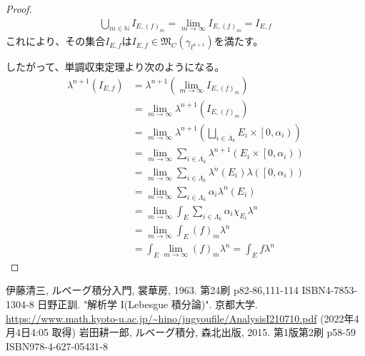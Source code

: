 \documentclass[dvipdfmx]{jsarticle}
\begin{document}
\begin{proof}
\begin{align*}
\bigcup_{m \in \mathbb{N}} I_{E,(f)_{m}} = \lim_{m \rightarrow \infty}I_{E,(f)_{m}} = I_{E,f}
\end{align*}
これにより、その集合$I_{E,f}$は$I_{E,f} \in \mathfrak{M}_{C}\left( \gamma_{l^{n + 1}} \right)$を満たす。\par
したがって、単調収束定理より次のようになる。
\begin{align*}
\lambda^{n + 1}\left( I_{E,f} \right) &= \lambda^{n + 1}\left( \lim_{m \rightarrow \infty}I_{E,(f)_{m}} \right)\\
&= \lim_{m \rightarrow \infty}{\lambda^{n + 1}\left( I_{E,(f)_{m}} \right)}\\
&= \lim_{m \rightarrow \infty}{\lambda^{n + 1}\left( \bigsqcup_{i \in \varLambda_{k}} {E_{i} \times \left[ 0,\alpha_{i} \right)} \right)}\\
&= \lim_{m \rightarrow \infty}{\sum_{i \in \varLambda_{k}} {\lambda^{n + 1}\left( E_{i} \times \left[ 0,\alpha_{i} \right) \right)}}\\
&= \lim_{m \rightarrow \infty}{\sum_{i \in \varLambda_{k}} {\lambda^{n}\left( E_{i} \right)\lambda\left( \left[ 0,\alpha_{i} \right) \right)}}\\
&= \lim_{m \rightarrow \infty}{\sum_{i \in \varLambda_{k}} {\alpha_{i}\lambda^{n}\left( E_{i} \right)}}\\
&= \lim_{m \rightarrow \infty}{\int_{E} {\sum_{i \in \varLambda_{k}} {\alpha_{i}\chi_{E_{i}}}\lambda^{n}}}\\
&= \lim_{m \rightarrow \infty}{\int_{E} {(f)_{m}\lambda^{n}}}\\
&= \int_{E} {\lim_{m \rightarrow \infty}(f)_{m}\lambda^{n}} = \int_{E} {f\lambda^{n}}
\end{align*}
\end{proof}
\begin{thebibliography}{50}
  伊藤清三, ルベーグ積分入門, 裳華房, 1963. 第24刷 p82-86,111-114 ISBN4-7853-1304-8
  日野正訓. "解析学 I(Lebesgue 積分論)". 京都大学. \url{https://www.math.kyoto-u.ac.jp/~hino/jugyoufile/AnalysisI210710.pdf} (2022年4月4日4:05 取得)
  岩田耕一郎, ルベーグ積分, 森北出版, 2015. 第1版第2刷 p58-59 ISBN978-4-627-05431-8
\end{thebibliography}
\end{document}
